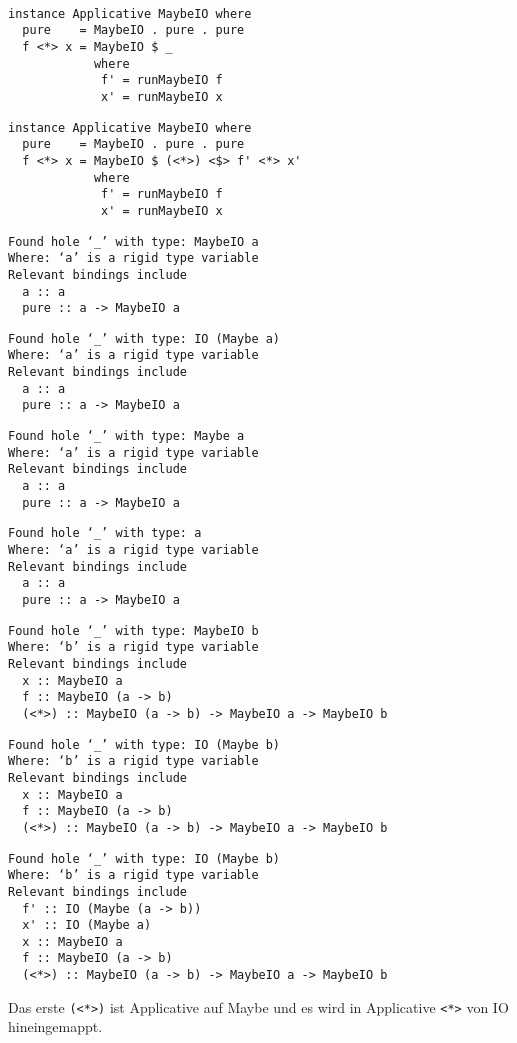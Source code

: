 \documentclass{beamer}
\begin{document}
\begin{frame}[fragile]
\begin{overprint}
\begin{verbatim}
                 
\end{verbatim}
\begin{verbatim}
instance Applicative MaybeIO where
  pure    = MaybeIO . pure . pure
  f <*> x = MaybeIO $ _
            where
             f' = runMaybeIO f
             x' = runMaybeIO x
\end{verbatim}
\begin{verbatim}
instance Applicative MaybeIO where
  pure    = MaybeIO . pure . pure
  f <*> x = MaybeIO $ (<*>) <$> f' <*> x'
            where
             f' = runMaybeIO f
             x' = runMaybeIO x
\end{verbatim}
\end{overprint}
\bigskip
\scriptsize
\begin{overprint}
\begin{verbatim}
Found hole ‘_’ with type: MaybeIO a
Where: ‘a’ is a rigid type variable
Relevant bindings include
  a :: a
  pure :: a -> MaybeIO a
\end{verbatim}
\begin{verbatim}
Found hole ‘_’ with type: IO (Maybe a)
Where: ‘a’ is a rigid type variable
Relevant bindings include
  a :: a
  pure :: a -> MaybeIO a
\end{verbatim}
\begin{verbatim}
Found hole ‘_’ with type: Maybe a
Where: ‘a’ is a rigid type variable
Relevant bindings include
  a :: a
  pure :: a -> MaybeIO a
\end{verbatim}
\begin{verbatim}
Found hole ‘_’ with type: a
Where: ‘a’ is a rigid type variable
Relevant bindings include
  a :: a
  pure :: a -> MaybeIO a
\end{verbatim}
\begin{verbatim}
Found hole ‘_’ with type: MaybeIO b
Where: ‘b’ is a rigid type variable
Relevant bindings include
  x :: MaybeIO a
  f :: MaybeIO (a -> b)
  (<*>) :: MaybeIO (a -> b) -> MaybeIO a -> MaybeIO b
\end{verbatim}
\begin{verbatim}
Found hole ‘_’ with type: IO (Maybe b)
Where: ‘b’ is a rigid type variable
Relevant bindings include
  x :: MaybeIO a
  f :: MaybeIO (a -> b)
  (<*>) :: MaybeIO (a -> b) -> MaybeIO a -> MaybeIO b
\end{verbatim}
\begin{verbatim}
Found hole ‘_’ with type: IO (Maybe b)
Where: ‘b’ is a rigid type variable
Relevant bindings include
  f' :: IO (Maybe (a -> b))
  x' :: IO (Maybe a)
  x :: MaybeIO a
  f :: MaybeIO (a -> b)
  (<*>) :: MaybeIO (a -> b) -> MaybeIO a -> MaybeIO b
\end{verbatim}
\normalsize
Das erste \texttt{(<*>)} ist Applicative auf Maybe und es wird in Applicative \texttt{<*>} von IO hineingemappt.
\end{overprint}
\end{frame}
\end{document}
